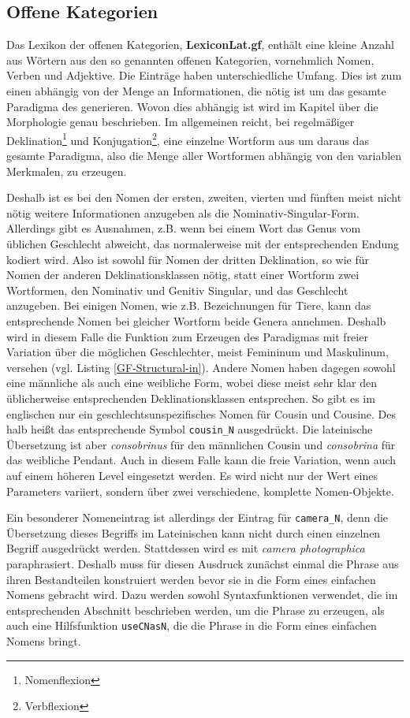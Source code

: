 \documentclass[fontsize=12pt,abstract=on,titlepage,bibliography=totoc,ngerman,listof=totoc]{scrreprt}
\begin{document}
\subsection{Offene Kategorien}
\label{subsec:offene}
Das Lexikon der offenen Kategorien, \textbf{LexiconLat.gf}, enthält eine kleine Anzahl aus Wörtern aus den so genannten offenen Kategorien, vornehmlich Nomen, Verben und Adjektive. Die Einträge haben unterschiedliche Umfang. Dies ist zum einen abhängig von der Menge an Informationen, die nötig ist um das gesamte Paradigma des generieren. Wovon dies abhängig ist wird im Kapitel über die Morphologie genau beschrieben. Im allgemeinen reicht, bei regelmäßiger Deklination\footnote{Nomenflexion} und Konjugation\footnote{Verbflexion}, eine einzelne Wortform aus um daraus das gesamte Paradigma, also die Menge aller Wortformen abhängig von den variablen Merkmalen, zu erzeugen. \par
Deshalb ist es bei den Nomen der ersten, zweiten, vierten und fünften meist nicht nötig weitere Informationen anzugeben als die Nominativ-Singular-Form. Allerdings gibt es Ausnahmen, z.B. wenn bei einem Wort das Genus vom üblichen Geschlecht abweicht, das normalerweise mit der entsprechenden Endung kodiert wird. Also ist sowohl für Nomen der dritten Deklination, so wie für Nomen der anderen Deklinationsklassen nötig, statt einer Wortform zwei Wortformen, den Nominativ und Genitiv Singular, und das Geschlecht anzugeben. Bei einigen Nomen, wie z.B. Bezeichnungen für Tiere, kann das entsprechende Nomen bei gleicher Wortform beide Genera annehmen. Deshalb wird in diesem Falle die Funktion zum Erzeugen des Paradigmas mit freier Variation über die möglichen Geschlechter, meist Femininum und Maskulinum, versehen (vgl. Listing \ref{GF-Structural-in}). Andere Nomen haben dagegen sowohl eine männliche als auch eine weibliche Form, wobei diese meist sehr klar den üblicherweise entsprechenden Deklinationsklassen entsprechen. So gibt es im englischen nur ein geschlechtsunspezifisches Nomen für Cousin und Cousine. Des halb heißt das entsprechende Symbol \texttt{cousin\_N} ausgedrückt. Die lateinische Übersetzung ist aber \textit{consobrinus} für den männlichen Cousin und \textit{consobrina} für das weibliche Pendant. Auch in diesem Falle kann die freie Variation, wenn auch auf einem höheren Level eingesetzt werden. Es wird nicht nur der Wert eines Parameters variiert, sondern über zwei verschiedene, komplette Nomen-Objekte. \par 
Ein besonderer Nomeneintrag ist allerdings der Eintrag für \texttt{camera\_N}, denn die Übersetzung dieses Begriffs im Lateinischen kann nicht durch einen einzelnen Begriff ausgedrückt werden. Stattdessen wird es mit \textit{camera photographica} paraphrasiert. Deshalb muss für diesen Ausdruck zunächst einmal die Phrase aus ihren Bestandteilen konstruiert werden bevor sie in die Form eines einfachen Nomens gebracht wird. Dazu werden sowohl Syntaxfunktionen verwendet, die im entsprechenden Abschnitt beschrieben werden, um die Phrase zu erzeugen, als auch eine Hilfsfunktion \texttt{useCNasN}, die die Phrase in die Form eines einfachen Nomens bringt. \par
\end{document}
